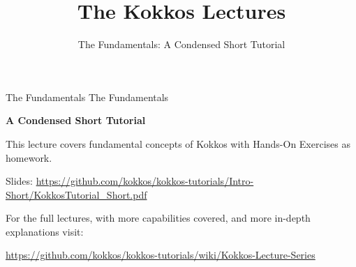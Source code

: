 


\title{The Kokkos Lectures}

\author{The Fundamentals: A Condensed Short Tutorial}




\shorttrue
\mediumfalse
\fullfalse



% 

\begin{frame}
	\titlepage
\end{frame}

\begin{frame}{The Fundamentals}
	{\huge The Fundamentals}

	\textbf{A Condensed Short Tutorial}

	\vspace{10pt}
	This lecture covers fundamental concepts of Kokkos with Hands-On Exercises as homework.

	Slides: \url{https://github.com/kokkos/kokkos-tutorials/Intro-Short/KokkosTutorial_Short.pdf}

	\vspace{20pt}
	For the full lectures, with more capabilities covered, and more in-depth explanations visit:

	\url{https://github.com/kokkos/kokkos-tutorials/wiki/Kokkos-Lecture-Series}
\end{frame}




